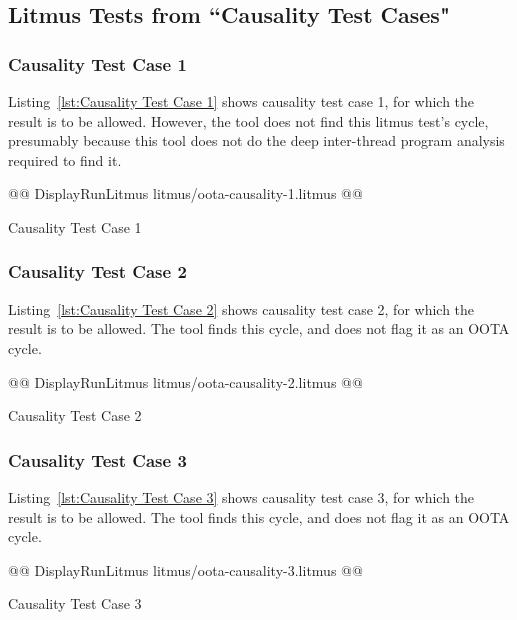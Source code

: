 \documentclass[10]{article}
\begin{document}
\subsection{Litmus Tests from “Causality Test Cases"}
\label{app:Litmus Tests from “Causality Test Cases"}

\subsubsection{Causality Test Case 1}
\label{app:Causality Test Case 1}

Listing~\ref{lst:Causality Test Case 1}
shows causality test case 1, for which the  result
is to be allowed.
However, the  tool does not find this litmus test's cycle, presumably
because this tool does not do the deep inter-thread program analysis
required to find it.

\begin{listing}[tbp]
@@ DisplayRunLitmus litmus/oota-causality-1.litmus @@
\caption{Causality Test Case 1}
\label{lst:Causality Test Case 1}
\end{listing}

\subsubsection{Causality Test Case 2}
\label{app:Causality Test Case 2}

Listing~\ref{lst:Causality Test Case 2}
shows causality test case 2, for which the  result
is to be allowed.
The  tool finds this cycle, and does not flag it as an OOTA cycle.

\begin{listing}[tbp]
@@ DisplayRunLitmus litmus/oota-causality-2.litmus @@
\caption{Causality Test Case 2}
\label{lst:Causality Test Case 2}
\end{listing}

\subsubsection{Causality Test Case 3}
\label{app:Causality Test Case 3}

Listing~\ref{lst:Causality Test Case 3}
shows causality test case 3, for which the  result
is to be allowed.
The  tool finds this cycle, and does not flag it as an OOTA cycle.

\begin{listing}[tbp]
@@ DisplayRunLitmus litmus/oota-causality-3.litmus @@
\caption{Causality Test Case 3}
\label{lst:Causality Test Case 3}
\end{listing}
\end{document}
